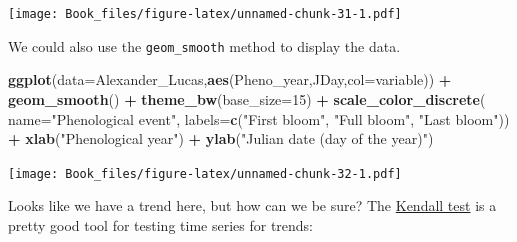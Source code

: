 \documentclass[
]{book}
\newenvironment{Shaded}{\begin{snugshade}}{\end{snugshade}}
\newcommand{\DataTypeTok}[1]{\textcolor[rgb]{0.13,0.29,0.53}{#1}}
\newcommand{\DecValTok}[1]{\textcolor[rgb]{0.00,0.00,0.81}{#1}}
\newcommand{\KeywordTok}[1]{\textcolor[rgb]{0.13,0.29,0.53}{\textbf{#1}}}
\newcommand{\NormalTok}[1]{#1}
\newcommand{\OperatorTok}[1]{\textcolor[rgb]{0.81,0.36,0.00}{\textbf{#1}}}
\newcommand{\StringTok}[1]{\textcolor[rgb]{0.31,0.60,0.02}{#1}}
\begin{document}
\texttt{[image: Book\_files/figure-latex/unnamed-chunk-31-1.pdf]}

We could also use the \texttt{geom\_smooth} method to display the data.

\begin{Shaded}
\begin{Highlighting}[]
\KeywordTok{ggplot}\NormalTok{(}\DataTypeTok{data=}\NormalTok{Alexander_Lucas,}\KeywordTok{aes}\NormalTok{(Pheno_year,JDay,}\DataTypeTok{col=}\NormalTok{variable)) }\OperatorTok{+}
\StringTok{  }\KeywordTok{geom_smooth}\NormalTok{() }\OperatorTok{+}
\StringTok{  }\KeywordTok{theme_bw}\NormalTok{(}\DataTypeTok{base_size=}\DecValTok{15}\NormalTok{) }\OperatorTok{+}
\StringTok{  }\KeywordTok{scale_color_discrete}\NormalTok{(}
    \DataTypeTok{name=}\StringTok{"Phenological event"}\NormalTok{,}
    \DataTypeTok{labels=}\KeywordTok{c}\NormalTok{(}\StringTok{"First bloom"}\NormalTok{, }\StringTok{"Full bloom"}\NormalTok{, }\StringTok{"Last bloom"}\NormalTok{)) }\OperatorTok{+}
\StringTok{  }\KeywordTok{xlab}\NormalTok{(}\StringTok{"Phenological year"}\NormalTok{) }\OperatorTok{+}
\StringTok{  }\KeywordTok{ylab}\NormalTok{(}\StringTok{"Julian date (day of the year)"}\NormalTok{) }
\end{Highlighting}
\end{Shaded}

\texttt{[image: Book\_files/figure-latex/unnamed-chunk-32-1.pdf]}

Looks like we have a trend here, but how can we be sure? The \href{https://en.wikipedia.org/wiki/Kendall_rank_correlation_coefficient}{Kendall test} is a pretty good tool for testing time series for trends:
\end{document}
